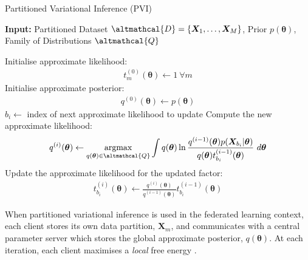 \begin{algorithm}
	\caption{Partitioned Variational Inference (PVI)}
	\label{alg:PVI}
	\hspace*{\algorithmicindent} \textbf{Input:} Partitioned Dataset $\altmathcal{D} = \lbrace \bm{X}_1, \ldots, \bm{X}_M \rbrace$, Prior $p(\bm{\theta})$, Family of Distributions $\altmathcal{Q}$
	\begin{algorithmic}[1] %
		\State Initialise approximate likelihood: \begin{align}
			t_m^{(0)}(\bm{\theta}) \leftarrow 1\ \forall m 
		\end{align} 
		\State Initialise approximate posterior:
		\begin{align}
		q^{(0)}(\bm{\theta}) \leftarrow p(\bm{\theta})
		\end{align} 
		\State $b_i \leftarrow $ index of next approximate likelihood to update
		\State Compute the new approximate likelihood:
		\begin{align}
		q^{(i)}(\bm{\theta}) \leftarrow  \mathop{\mathrm{argmax}}_{q(\bm{\theta}) \in \altmathcal{Q}} \int q(\bm{\theta}) \ln \frac{q^{(i-1)}(\bm{\theta}) p(\bm{X}_{b_i}|\bm{\theta})}{q(\bm{\theta}) t_{b_i}^{(i-1)}(\bm{\theta})}\ d\bm{\theta} \label{eq:local_free_energy_optimisation}
		\end{align}
		\State Update the approximate likelihood for the updated factor:
		\begin{align}
		t_{b_i}^{(i)}(\bm{\theta}) \leftarrow \frac{q^{(i)}(\bm{\theta})}{q^{(i-1)}(\bm{\theta})} t_{b_i}^{(i-1)}(\bm{\theta}) \label{eq:update_likelihood}
		\end{align}
		\EndFor
	\end{algorithmic}
\end{algorithm}

When partitioned variational inference is used in the federated learning context, each client stores its own data partition, $\bm{X}_m$, and communicates with a central parameter server which stores the global approximate posterior, $q(\bm{\theta})$. At each iteration, each client maximises a \emph{local} free energy \citep{PVI}. 

